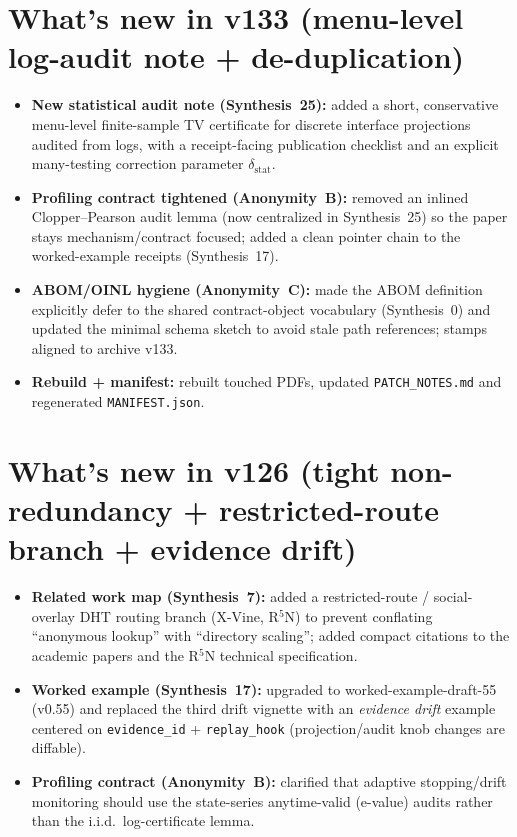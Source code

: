 \documentclass[11pt]{article}
\begin{document}
\section{What's new in v133 (menu-level log-audit note + de-duplication)}
\begin{itemize}[leftmargin=*]
\item \textbf{New statistical audit note (Synthesis~25):} added a short, conservative menu-level finite-sample TV certificate for discrete interface projections audited from logs, with a receipt-facing publication checklist and an explicit many-testing correction parameter $\delta_{\mathrm{stat}}$.
\item \textbf{Profiling contract tightened (Anonymity~B):} removed an inlined Clopper--Pearson audit lemma (now centralized in Synthesis~25) so the paper stays mechanism/contract focused; added a clean pointer chain to the worked-example receipts (Synthesis~17).
\item \textbf{ABOM/OINL hygiene (Anonymity~C):} made the ABOM definition explicitly defer to the shared contract-object vocabulary (Synthesis~0) and updated the minimal schema sketch to avoid stale path references; stamps aligned to archive v133.
\item \textbf{Rebuild + manifest:} rebuilt touched PDFs, updated \texttt{PATCH\_NOTES.md} and regenerated \texttt{MANIFEST.json}.
\end{itemize}

\section{What's new in v126 (tight non-redundancy + restricted-route branch + evidence drift)}
\begin{itemize}[leftmargin=*]
\item \textbf{Related work map (Synthesis~7):} added a restricted-route / social-overlay DHT routing branch (X-Vine, R$^{5}$N) to prevent conflating ``anonymous lookup'' with ``directory scaling''; added compact citations to the academic papers and the R$^{5}$N technical specification.
\item \textbf{Worked example (Synthesis~17):} upgraded to worked-example-draft-55 (v0.55) and replaced the third drift vignette with an \emph{evidence drift} example centered on \texttt{evidence\_id} + \texttt{replay\_hook} (projection/audit knob changes are diffable).
\item \textbf{Profiling contract (Anonymity~B):} clarified that adaptive stopping/drift monitoring should use the state-series anytime-valid (e-value) audits rather than the i.i.d.\ log-certificate lemma.
\end{itemize}
\end{document}
